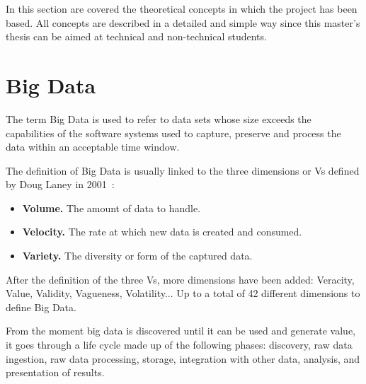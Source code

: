 

\nonzeroparskip In this section are covered the theoretical concepts in which the project has been based. All concepts are described in a detailed and simple way since this master's thesis can be aimed at technical and non-technical students.

\section{Big Data}

\nonzeroparskip The term Big Data is used to refer to data sets whose size exceeds the capabilities of the software systems used to capture, preserve and process the data within an acceptable time window.

\nonzeroparskip The definition of Big Data is usually linked to the three dimensions or Vs defined by Doug Laney in 2001~\cite{bigdata_vs}:
\begin{itemize}
	\item \textbf{Volume.} The amount of data to handle.
	\item \textbf{Velocity.} The rate at which new data is created and consumed.
	\item \textbf{Variety.} The diversity or form of the captured data.
\end{itemize}

\nonzeroparskip After the definition of the three Vs, more dimensions have been added: Veracity, Value, Validity, Vagueness, Volatility... Up to a total of 42 different dimensions to define Big Data.

\nonzeroparskip From the moment big data is discovered until it can be used and generate value, it goes through a life cycle made up of the following phases: discovery, raw data ingestion, raw data processing, storage, integration with other data, analysis, and presentation of results.

